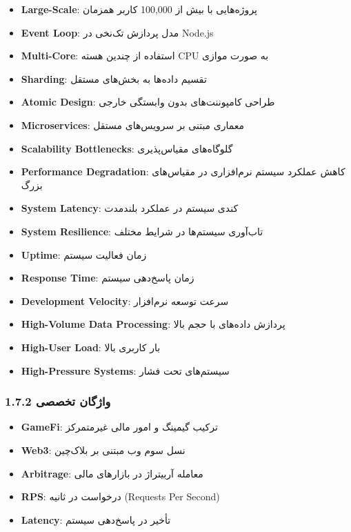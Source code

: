 \documentclass[
]{article}
\providecommand{\tightlist}{%
  \setlength{\itemsep}{0pt}\setlength{\parskip}{0pt}}
\begin{document}
\begin{itemize}
\tightlist
\item
  \textbf{Large-Scale}: پروژه‌هایی با بیش از 100,000 کاربر همزمان
\item
  \textbf{Event Loop}: مدل پردازش تک‌نخی در Node.js
\item
  \textbf{Multi-Core}: استفاده از چندین هسته CPU به صورت موازی
\item
  \textbf{Sharding}: تقسیم داده‌ها به بخش‌های مستقل
\item
  \textbf{Atomic Design}: طراحی کامپوننت‌های بدون وابستگی خارجی
\item
  \textbf{Microservices}: معماری مبتنی بر سرویس‌های مستقل
\item
  \textbf{Scalability Bottlenecks}: گلوگاه‌های مقیاس‌پذیری
\item
  \textbf{Performance Degradation}: کاهش عملکرد سیستم نرم‌افزاری در
  مقیاس‌های بزرگ
\item
  \textbf{System Latency}: کندی سیستم در عملکرد بلندمدت
\item
  \textbf{System Resilience}: تاب‌آوری سیستم‌ها در شرایط مختلف
\item
  \textbf{Uptime}: زمان فعالیت سیستم
\item
  \textbf{Response Time}: زمان پاسخ‌دهی سیستم
\item
  \textbf{Development Velocity}: سرعت توسعه نرم‌افزار
\item
  \textbf{High-Volume Data Processing}: پردازش داده‌های با حجم بالا
\item
  \textbf{High-User Load}: بار کاربری بالا
\item
  \textbf{High-Pressure Systems}: سیستم‌های تحت فشار
\end{itemize}

\subsubsection{1.7.2 واژگان
تخصصی}\label{ux648ux627ux698ux6afux627ux646-ux62aux62eux635ux635ux6cc}

\begin{itemize}
\tightlist
\item
  \textbf{GameFi}: ترکیب گیمینگ و امور مالی غیرمتمرکز
\item
  \textbf{Web3}: نسل سوم وب مبتنی بر بلاک‌چین
\item
  \textbf{Arbitrage}: معامله آربیتراژ در بازارهای مالی
\item
  \textbf{RPS}: درخواست در ثانیه (Requests Per Second)
\item
  \textbf{Latency}: تأخیر در پاسخ‌دهی سیستم
\end{itemize}
\end{document}
